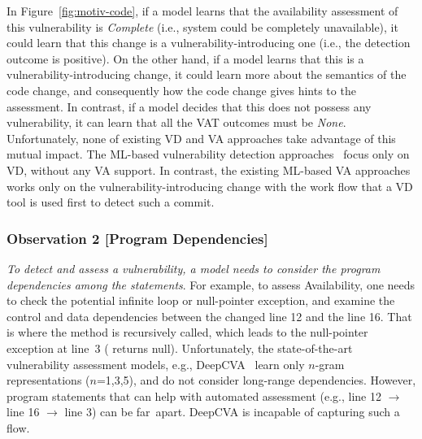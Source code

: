 In Figure~\ref{fig:motiv-code}, if a model learns that the
availability assessment of this vulnerability is {\em Complete} (i.e.,
system could be completely unavailable), it could learn that this
change is a vulnerability-introducing one (i.e., the detection outcome
is positive). On the other hand, if a model learns that this is a
vulnerability-introducing change, it could learn more about the
semantics of the code change, and consequently how the code change
gives hints to the assessment. In contrast, if a model decides that
this does not possess any vulnerability, it can learn that all the VAT
outcomes must be {\em None}. Unfortunately, none of existing VD and VA
approaches take advantage of this mutual impact. The ML-based
vulnerability detection
approaches~\cite{perl2015vccfinder,zhou2017automated,chen2019large}
focus only on VD, without any VA support. In contrast, the existing
ML-based VA approaches~\cite{deepCVA-ase21} works only on the
vulnerability-introducing change with the work flow that a VD tool is
used first to detect such a commit.


\subsubsection{Observation 2 [Program Dependencies]}

{\em To detect and assess a vulnerability, a model needs to consider
  the program dependencies among the statements}. For example, to
assess Availability, one needs to check the potential infinite loop or
null-pointer exception, and examine the control and data dependencies
between the changed line 12 and the line 16. That is where the method
 is recursively called, which leads to the null-pointer
exception at line~3 ( returns
null). Unfortunately, the state-of-the-art vulnerability assessment
models, e.g., DeepCVA~\cite{deepCVA-ase21} learn only $n$-gram
representations ($n$=1,3,5), and do not consider long-range
dependencies. However, program statements that can help with automated
assessment (e.g., line 12 $\rightarrow$ line 16 $\rightarrow$ line 3)
can be far~apart.
DeepCVA is incapable of capturing such a flow.


